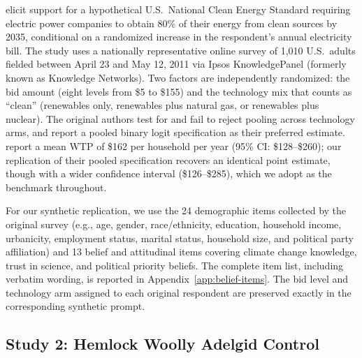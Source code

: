 \documentclass[12pt]{article}
\begin{document}
\textcite{Aldy2012} elicit support for a hypothetical U.S.\ National Clean
Energy Standard requiring electric power companies to obtain 80\% of their
energy from clean sources by 2035, conditional on a randomized increase in
the respondent's annual electricity bill. The study uses a nationally
representative online survey of 1{,}010 U.S.\ adults fielded between
April 23 and May 12, 2011 via Ipsos KnowledgePanel (formerly known as Knowledge Networks). Two
factors are independently randomized: the bid amount (eight levels from
\$5 to \$155) and the technology mix that counts as ``clean'' (renewables
only, renewables plus natural gas, or renewables plus nuclear). The
original authors test for and fail to reject pooling across technology
arms, and report a pooled binary logit specification as their preferred
estimate. \textcite{Aldy2012} report a mean WTP of \$162 per household per year (95\% CI:
\$128--\$260); our replication of their pooled specification recovers an identical point estimate, though with a wider confidence interval (\$126--\$285), which we adopt as the
benchmark throughout.

For our synthetic replication, we use the 24 demographic items
collected by the original survey (e.g., age, gender, race/ethnicity, education,
household income, urbanicity, employment status, marital status, household size,
and political party affiliation) and 13 belief and attitudinal items
covering climate
change knowledge, trust in science, and political priority beliefs. The complete item list, including verbatim wording, is
reported in Appendix~\ref{app:belief-items}. The bid level and technology
arm assigned to each original respondent are preserved exactly in the
corresponding synthetic prompt.

\subsection{Study 2: Hemlock Woolly Adelgid Control}\label{sec:data-hwa}
\end{document}
